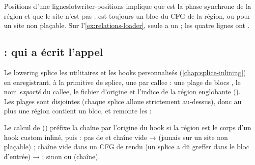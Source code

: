 \begin{invariant}{Positions d'une ligne}{slotwriter-positions}
 implique que  est la phase synchrone de la région et que le site n'est pas .  est toujours un bloc du CFG de la région, ou  pour un site non plaçable. Sur l'\cref{ex:relations-loader}, seule  a un  ; les quatre lignes ont .
\end{invariant}

\subsection{ : qui a écrit l'appel}


Le lowering splice les utilitaires et les hooks personnalisés (\cref{chap:splice-inlining}) en enregistrant, à la primitive de splice, une  par callee : une plage de blocs , le nom \emph{exporté} du callee, le fichier d'origine et l'indice de la région englobante (). Les plages sont disjointes (chaque splice alloue strictement au-dessus), donc au plus une région contient un bloc, et  remonte les  :


Le calcul de  () préfixe la chaîne par l'origine du hook si la région est le corps d'un hook custom inliné, puis : pas de  et chaîne vide →  (jamais  sur un site non plaçable) ; chaîne vide dans un CFG de rendu  (un splice a dû greffer dans le bloc d'entrée) →  ; sinon  ou (chaîne).


